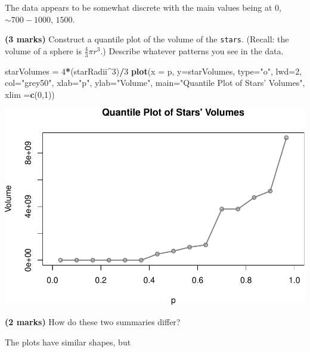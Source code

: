 \documentclass[9pt,letter]{article}
\newenvironment{Shaded}{\begin{snugshade}}{\end{snugshade}}
\newcommand{\KeywordTok}[1]{\textcolor[rgb]{0.13,0.29,0.53}{\textbf{#1}}}
\newcommand{\DataTypeTok}[1]{\textcolor[rgb]{0.13,0.29,0.53}{#1}}
\newcommand{\DecValTok}[1]{\textcolor[rgb]{0.00,0.00,0.81}{#1}}
\newcommand{\StringTok}[1]{\textcolor[rgb]{0.31,0.60,0.02}{#1}}
\newcommand{\OperatorTok}[1]{\textcolor[rgb]{0.81,0.36,0.00}{\textbf{#1}}}
\newcommand{\NormalTok}[1]{#1}
\begin{document}
The data appears to be somewhat discrete with the main values being at
\(0\), \(\sim700-1000\), \(1500\).

\item 

\textbf{(3 marks)} Construct a quantile plot of the volume of the
\texttt{stars}. (Recall: the volume of a sphere is
\(\frac{4}{3}\pi r^3\).) Describe whatever patterns you see in the data.

\begin{Shaded}
\begin{Highlighting}[]
\NormalTok{starVolumes =}\StringTok{ }\DecValTok{4}\OperatorTok{*}\NormalTok{(starRadii}\OperatorTok{^}\DecValTok{3}\NormalTok{)}\OperatorTok{/}\DecValTok{3}
\KeywordTok{plot}\NormalTok{(}\DataTypeTok{x =}\NormalTok{ p, }\DataTypeTok{y=}\NormalTok{starVolumes, }
      \DataTypeTok{type=}\StringTok{"o"}\NormalTok{, }\DataTypeTok{lwd=}\DecValTok{2}\NormalTok{, }\DataTypeTok{col=}\StringTok{"grey50"}\NormalTok{,}
      \DataTypeTok{xlab=}\StringTok{"p"}\NormalTok{, }\DataTypeTok{ylab=}\StringTok{"Volume"}\NormalTok{,}
      \DataTypeTok{main=}\StringTok{"Quantile Plot of Stars' Volumes"}\NormalTok{,}
      \DataTypeTok{xlim =}\KeywordTok{c}\NormalTok{(}\DecValTok{0}\NormalTok{,}\DecValTok{1}\NormalTok{))}
\end{Highlighting}
\end{Shaded}

\includegraphics{a3_solutions_files/figure-latex/unnamed-chunk-15-1.pdf}

\item 

\textbf{(2 marks)} How do these two summaries differ?

The plots have similar shapes, but
\end{document}
